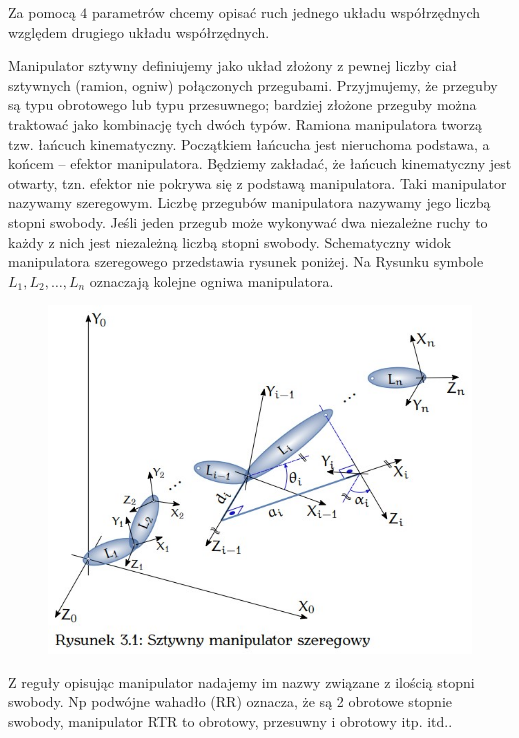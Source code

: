 \documentclass{article}
\begin{document}
Za pomocą $4$ parametrów chcemy opisać ruch jednego układu współrzędnych względem drugiego układu współrzędnych.


\newpage

Manipulator sztywny definiujemy jako układ złożony z pewnej liczby
ciał sztywnych (ramion, ogniw) połączonych przegubami. Przyjmujemy,
że przeguby są typu obrotowego lub typu przesuwnego; bardziej złożone
przeguby można traktować jako kombinację tych dwóch typów. Ramiona manipulatora tworzą tzw. łańcuch kinematyczny. Początkiem łańcucha jest nieruchoma podstawa, a końcem – efektor manipulatora. Będziemy zakładać, że łańcuch kinematyczny jest otwarty, tzn. efektor nie
pokrywa się z podstawą manipulatora. Taki manipulator nazywamy szeregowym. Liczbę przegubów manipulatora nazywamy jego liczbą stopni
swobody. Jeśli jeden przegub może wykonywać dwa niezależne ruchy to każdy z nich jest niezależną liczbą stopni swobody. Schematyczny widok manipulatora szeregowego przedstawia rysunek poniżej. Na Rysunku symbole $L_{1}, L_{2}, \dots , L_{n}$ oznaczają kolejne ogniwa manipulatora.


\begin{figure}[h!]
    \centering
    \includegraphics[scale=0.5]{img/manipulator_sz.jpg}
\end{figure}

Z reguły opisując manipulator nadajemy im nazwy związane z ilością stopni swobody.
Np podwójne wahadło (RR) oznacza, że są 2 obrotowe stopnie swobody, manipulator RTR to obrotowy, przesuwny i obrotowy itp. itd..
\end{document}
